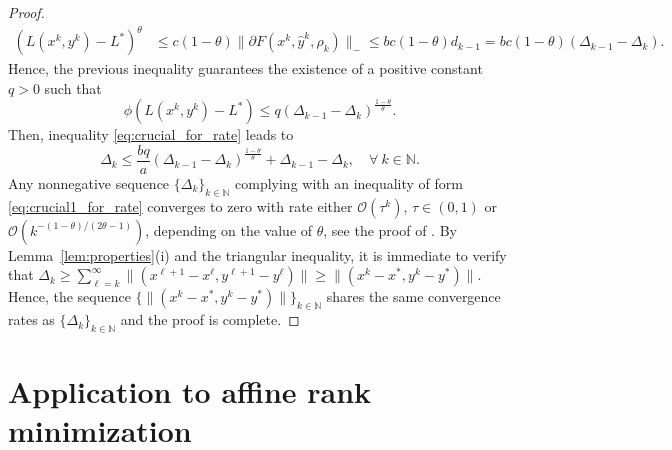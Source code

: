 \documentclass[pdflatex,sn-mathphys-num]{sn-jnl}
\numberwithin{equation}{section}%
\def\N{\mathbb{N}}
\theoremstyle{thmstyleone}%
\theoremstyle{thmstyletwo}%
\theoremstyle{thmstylethree}%
\begin{document}
\begin{proof}
\begin{align*}
    (L(x^k,y^k)-L^*)^{\theta}&\leq c(1-\theta)\|\partial F(x^{k},\hat{y}^{k},\rho_k)\|_{-}\leq bc(1-\theta)d_{k-1}
    =bc(1-\theta)(\Delta_{k-1}-\Delta_k).
\end{align*}
Hence, the previous inequality guarantees the existence of a positive constant $q>0$ such that
\begin{equation*}
    \phi(L(x^k,y^k)-L^*)\leq q(\Delta_{k-1}-\Delta_k)^{\frac{1-\theta}{\theta}}.
\end{equation*}
Then, inequality  \eqref{eq:crucial_for_rate} leads to
\begin{equation} \label{eq:crucial1_for_rate}
    \Delta_k\leq \frac{bq}{a}(\Delta_{k-1}-\Delta_k)^{\frac{1-\theta}{\theta}}+\Delta_{k-1}-\Delta_k, \quad \forall \ k\in\mathbb{N}.
\end{equation}
Any nonnegative sequence $\{\Delta_k\}_{k\in\N}$ complying with an inequality of form \eqref{eq:crucial1_for_rate} converges to zero with rate either $\mathcal{O}(\tau^k)$, $\tau\in (0,1)$ or $\mathcal{O}(k^{-(1-\theta)/(2\theta-1)})$, depending on the value of $\theta$, see the proof of \cite[Theorem 2]{attouch20009proximal}. {By Lemma~\ref{lem:properties}(i) and the triangular inequality, it is immediate to verify that $\Delta_k\geq \sum_{\ell = k}^{\infty}\|(x^{\ell+1}-x^\ell,y^{\ell+1}-y^{\ell})\|\geq \|(x^{k}-x^*,y^{k}-y^*)\|$. Hence, the sequence $\{\|(x^{k}-x^*,y^{k}-y^{*})\|\}_{k\in\N}$ shares the same convergence rates as $\{\Delta_k\}_{k\in\N}$ and the proof is complete.}
\end{proof}

\section{Application to affine rank minimization}\label{sec:application}
\end{document}
